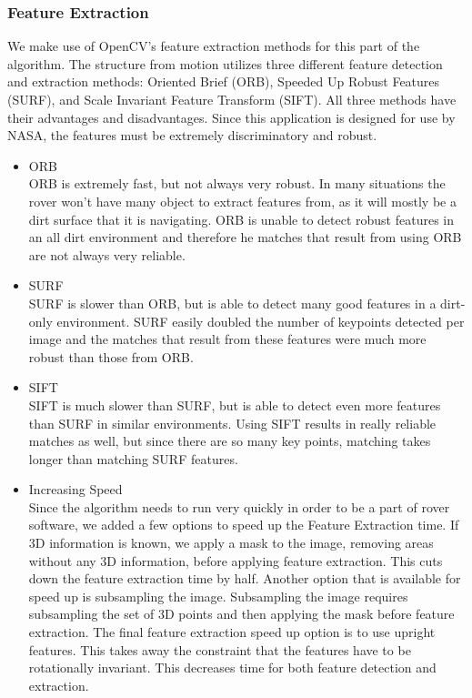 \subsubsection{Feature Extraction}
	We make use of OpenCV's feature extraction methods for this part of the algorithm. The structure from motion utilizes three different feature detection and extraction methods: Oriented Brief (ORB), Speeded Up Robust Features (SURF), and Scale Invariant Feature Transform (SIFT). All three methods have their advantages and disadvantages. Since this application is designed for use by NASA, the features must be extremely discriminatory and robust.
\begin{itemize} 
\item{ORB} \\
	ORB is extremely fast, but not always very robust. In many situations the rover won't have many object to extract features from, as it will mostly be a dirt surface that it is navigating. ORB is unable to detect robust features in an all dirt environment and therefore he matches that result from using ORB are not always very reliable.
\item{SURF} \\
	SURF is slower than ORB, but is able to detect many good features in a dirt-only environment. SURF easily doubled the number of keypoints detected per image and the matches that result from these features were much more robust than those from ORB.
\item{SIFT} \\
	SIFT is much slower than SURF, but is able to detect even more features than SURF in similar environments. Using SIFT results in really reliable matches as well, but since there are so many key points, matching takes longer than matching SURF features.
\item{Increasing Speed} \\
	Since the algorithm needs to run very quickly in order to be a part of rover software, we added a few options to speed up the Feature Extraction time. If 3D information is known, we apply a mask to the image, removing areas without any 3D information, before applying feature extraction. This cuts down the feature extraction time by half. Another option that is available for speed up is subsampling the image. Subsampling the image requires subsampling the set of 3D points and then applying the mask before feature extraction. The final feature extraction speed up option is to use upright features. This takes away the constraint that the features have to be rotationally invariant. This decreases time for both feature detection and extraction.
\end{itemize}

